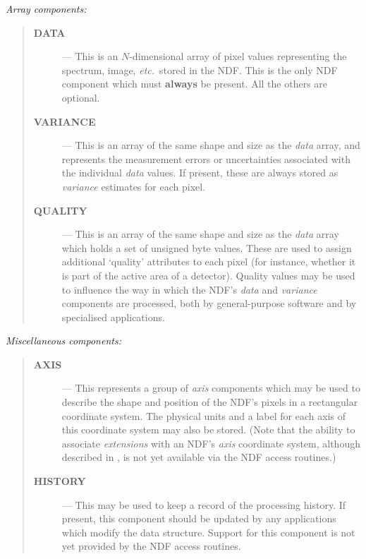 {\large \em Array components:}

\begin{quote}
\begin{description}

\item[{\bf DATA}] --- This is an $N$-dimensional array of pixel values
representing the spectrum, image, {\em etc.}\ stored in the NDF.
This is the only NDF component which must {\bf always} be present.
All the others are optional.

\item[{\bf VARIANCE}] --- This is an array of the same shape and size as the
{\em data\/} array, and represents the measurement errors or uncertainties
associated with the individual {\em data\/} values.
If present, these are always stored as {\em variance\/} estimates for each
pixel.

\item[{\bf QUALITY}] --- This is an array of the same shape and size as the
{\em data\/} array which holds a set of unsigned byte values.
These are used to assign additional `quality' attributes to each pixel (for
instance, whether it is part of the active area of a detector).
Quality values may be used to influence the way in which the NDF's {\em data\/}
and {\em variance\/} components are processed, both by general-purpose software
and by specialised applications.

\end{description}
\end{quote}

{\large \em Miscellaneous components:}

\begin{quote}
\begin{description}

\item[{\bf AXIS}] --- This represents a group of {\em axis\/} components which
may be used to describe the shape and position of the NDF's pixels in a
rectangular coordinate system.
The physical units and a label for each axis of this coordinate system may
also be stored.
(Note that the ability to associate {\em extensions\/} with an NDF's {\em
axis\/} coordinate system, although described in , is
not yet available via the NDF access routines.)

\item[{\bf HISTORY}] --- This may be used to keep a record of the processing
history.
If present, this component should be updated by any applications which
modify the data structure.
Support for this component is not yet provided by the NDF access routines.

\end{description}
\end{quote}

